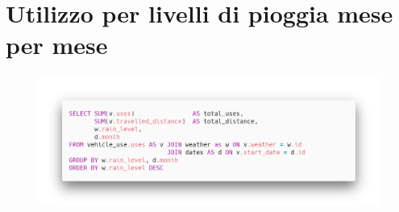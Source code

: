 \section{Utilizzo per livelli di pioggia mese per mese}
\begin{figure}[H]                                                                                                                                                            
\centering                                                                                                                                                                   
\includegraphics[width=\textwidth]{images/query2}                                                                                                                                   
\label{fig:query2}                                                                                                                                                           
\end{figure}

